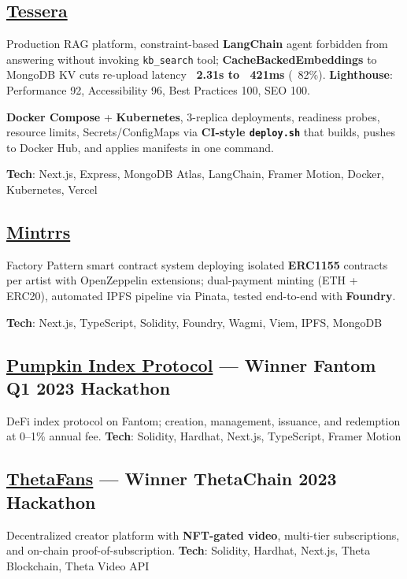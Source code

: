 \documentclass[letter,10pt]{article}
\begin{document}
\subsection{{\href{https://github.com/JustUzair/Tessera-RAG-AI}{Tessera}}}
\begin{zitemize}
  \item Production RAG platform, constraint-based \textbf{LangChain} agent forbidden from answering without invoking \texttt{kb\_search} tool; \textbf{CacheBackedEmbeddings} to MongoDB KV cuts re-upload latency \textbf{~2.31s to ~421ms} (~82\%). \textbf{Lighthouse}: Performance 92, Accessibility 96, Best Practices 100, SEO 100.
  \item \textbf{Docker Compose} + \textbf{Kubernetes}, 3-replica deployments, readiness probes, resource limits, Secrets/ConfigMaps via \textbf{CI-style \texttt{deploy.sh}} that builds, pushes to Docker Hub, and applies manifests in one command.
  \item \textbf{Tech}: Next.js, Express, MongoDB Atlas, LangChain, Framer Motion, Docker, Kubernetes, Vercel
\end{zitemize}

\subsection{{\href{https://github.com/JustUzair/NFT-Generator}{Mintrrs}}}
\begin{zitemize}
  \item Factory Pattern smart contract system deploying isolated \textbf{ERC1155} contracts per artist with OpenZeppelin extensions; dual-payment minting (ETH + ERC20), automated IPFS pipeline via Pinata, tested end-to-end with \textbf{Foundry}.
  \item \textbf{Tech}: Next.js, TypeScript, Solidity, Foundry, Wagmi, Viem, IPFS, MongoDB
\end{zitemize}

\subsection{{\href{https://github.com/JustUzair/Pumpkin-Protocol}{Pumpkin Index Protocol} --- Winner Fantom Q1 2023 Hackathon}}
\begin{zitemize}
  \item DeFi index protocol on Fantom; creation, management, issuance, and redemption at 0--1\% annual fee. \textbf{Tech}: Solidity, Hardhat, Next.js, TypeScript, Framer Motion
\end{zitemize}

\subsection{{\href{https://github.com/JustUzair/ThetaFans}{ThetaFans} --- Winner ThetaChain 2023 Hackathon}}
\begin{zitemize}
  \item Decentralized creator platform with \textbf{NFT-gated video}, multi-tier subscriptions, and on-chain proof-of-subscription. \textbf{Tech}: Solidity, Hardhat, Next.js, Theta Blockchain, Theta Video API
\end{zitemize}
\end{document}
